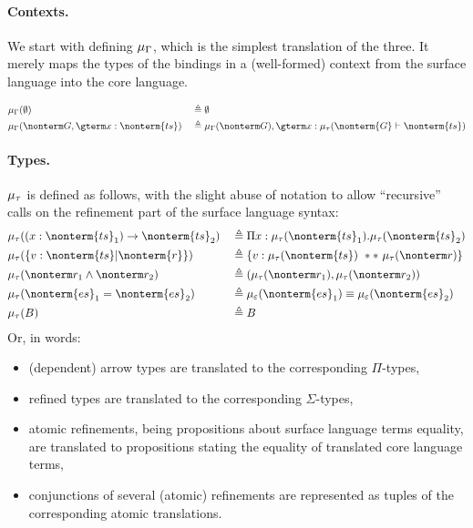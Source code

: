 \documentclass[a4paper]{article}
\begin{document}
\paragraph{Contexts.}
We start with defining $\mu_\Gamma$,
which is the simplest translation of the three.
It merely maps the types of the bindings in a (well-formed) context
from the surface language into the core language.

\begin{equation}
\begin{aligned}
  & \tranctx(\emptyset)
      && \triangleq
    \emptyset                                               \\
  & \tranctx(\nonterm G, \gterm x : \nonterm{ts})
      && \triangleq
    \tranctx(\nonterm G), \gterm x : \tranty(\nonterm {G} \vdash \nonterm{ts})  \\
\end{aligned}
\end{equation}

\paragraph{Types.}
$\mu_\tau$ is defined as follows,
with the slight abuse of notation to allow ``recursive'' calls
on the refinement part of the surface language syntax:
\begin{equation}
\begin{aligned}
  & \tranty( (x : \nonterm{ts}_1) \rightarrow \nonterm{ts}_2)  && \triangleq \Pi x : \tranty(\nonterm{ts}_1). \tranty(\nonterm{ts}_2)     \\
  & \tranty( \{ v : \nonterm{ts} | \nonterm{r} \})             && \triangleq \{ v : \tranty(\nonterm{ts})\ **\ \tranty(\nonterm r) \}     \\
  & \tranty( \nonterm r_1 \land \nonterm r_2 )                 && \triangleq ( \tranty(\nonterm r_1) , \tranty(\nonterm r_2))             \\
  & \tranty( \nonterm{es}_1 = \nonterm{es}_2 )                 && \triangleq \tranterm(\nonterm{es}_1) \equiv \tranterm(\nonterm{es}_2)   \\
  & \tranty(B)                                                 && \triangleq B                                                            \\
\end{aligned}
\end{equation}
Or, in words:
\begin{itemize}
  \item (dependent) arrow types are translated to the corresponding $\Pi$-types,
  \item refined types are translated to the corresponding $\Sigma$-types,
  \item atomic refinements, being propositions about surface language terms equality,
    are translated to propositions stating the equality of translated core language terms,
  \item conjunctions of several (atomic) refinements are represented as tuples of the corresponding atomic translations.
\end{itemize}
\end{document}
